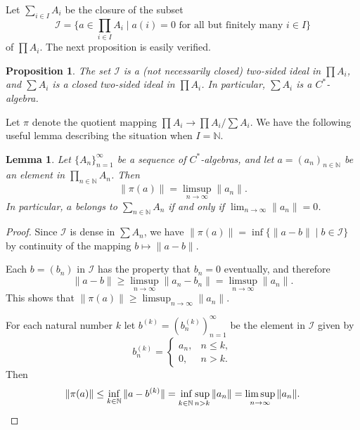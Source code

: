 \documentclass{book}
\newtheorem{lemma}[definition]{Lemma}
\newtheorem{proposition}[definition]{Proposition}
\def\cstar{\(C^*\)-algebra}
\def\cstars{\(C^*\)-algebras}
\begin{document}
Let \(\sum_{i\in I}A_i\) be the closure of the subset
\[
  \mathcal{I}=\{a\in\prod_{i\in I}A_i\mid a(i)=0\text{ for all but finitely many }i\in I\}
\]
of \(\prod A_i\). The next proposition is easily verified.
\begin{proposition}
  The set \(\mathcal{I}\) is a (not necessarily closed) two-sided ideal in \(\prod A_i\), and \(\sum A_i\) is a closed 
  two-sided ideal in \(\prod A_i\). In particular, \(\sum A_i\) is a \cstar.
\end{proposition}

Let \(\pi\) denote the quotient mapping \(\prod A_i\to \prod A_i/\sum A_i\). We have
the following useful lemma describing the situation when \(I=\mathbb{N}\).
\begin{lemma}\label{lemma:Lars613}
  Let \(\{A_n\}_{n=1}^\infty\) be a sequence of \cstars, and let \(a=(a_n)_{n\in\mathbb{N}}\) be an element
  in \(\prod_{n\in\mathbb{N}} A_n\). Then
  \[
    \|\pi(a)\|=\limsup_{n\to\infty}\|a_n\|.
  \]
  In particular, \(a\) belongs to \(\sum_{n\in\mathbb{N}}A_n\) if and only if \(\lim_{n\to\infty}\|a_n\|=0\).
\end{lemma}
\begin{proof}
  Since \(\mathcal{I}\) is dense in \(\sum A_n\), we have \(\|\pi(a)\|=\inf\{\|a-b\|\mid b\in\mathcal{I}\}\) by continuity
  of the mapping \(b\mapsto \|a-b\|\).\par
  Each \(b=(b_n)\) in \(\mathcal{I}\) has the property that \(b_n=0\) eventually, and therefore
  \[
    \|a-b\|\geq\limsup_{n\to\infty}\|a_n-b_n\|=\limsup_{n\to\infty}\|a_n\|.
  \]
  This shows that \(\|\pi(a)\|\geq\limsup_{n\to\infty}\|a_n\|\).\par
  For each natural number \(k\) let \(b^{(k)}=(b_n^{(k)})_{n=1}^\infty\) be the element in \(\mathcal{I}\) given by
  \[
    b_n^{(k)}=
    \begin{cases}
      a_n, & n\leq k,\\
      0,   & n>k.
    \end{cases}
  \]
  Then 
  \[
    \|\pi(a)\|\leq\inf_{k\in\mathbb{N}}\|a-b^{(k)}\|=\mathop{\vphantom{\sup}\inf}_{k\in\mathbb N}
    \sup_{n>k}\|a_n\|=\limsup_{n\to\infty}\|a_n\|.
  \]
\end{proof}
\end{document}
